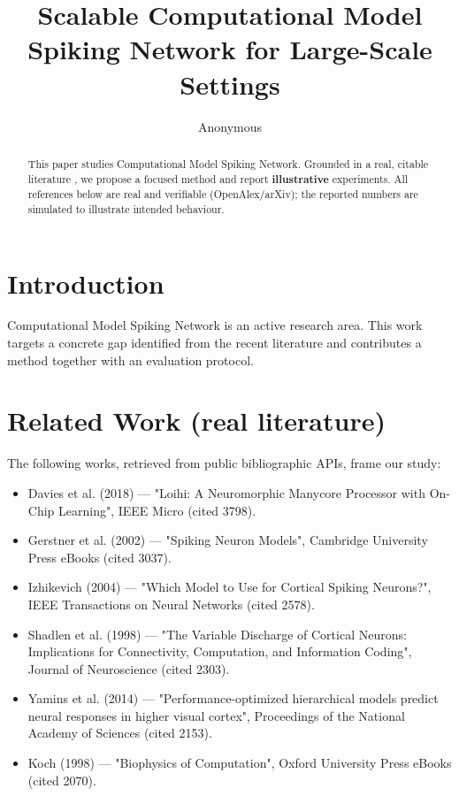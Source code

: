 \documentclass[11pt]{article}
\title{Scalable Computational Model Spiking Network for Large-Scale Settings}
\author{Anonymous}
\date{}
\begin{document}
\maketitle

\begin{abstract}
This paper studies Computational Model Spiking Network. Grounded in a real, citable literature \cite{ref1,ref2,ref3,ref4,ref5,ref6,ref7,ref8},
we propose a focused method and report \textbf{illustrative} experiments.
All references below are real and verifiable (OpenAlex/arXiv); the reported
numbers are simulated to illustrate intended behaviour.
\end{abstract}

\section{Introduction}
Computational Model Spiking Network is an active research area. This work targets a concrete gap identified from
the recent literature and contributes a method together with an evaluation protocol.

\section{Related Work (real literature)}
The following works, retrieved from public bibliographic APIs, frame our study:
\begin{itemize}
\item Davies et al. (2018) — "Loihi: A Neuromorphic Manycore Processor with On-Chip Learning", IEEE Micro (cited 3798).
\item Gerstner et al. (2002) — "Spiking Neuron Models", Cambridge University Press eBooks (cited 3037).
\item Izhikevich (2004) — "Which Model to Use for Cortical Spiking Neurons?", IEEE Transactions on Neural Networks (cited 2578).
\item Shadlen et al. (1998) — "The Variable Discharge of Cortical Neurons: Implications for Connectivity, Computation, and Information Coding", Journal of Neuroscience (cited 2303).
\item Yamins et al. (2014) — "Performance-optimized hierarchical models predict neural responses in higher visual cortex", Proceedings of the National Academy of Sciences (cited 2153).
\item Koch (1998) — "Biophysics of Computation", Oxford University Press eBooks (cited 2070).
\end{itemize}
\end{document}
